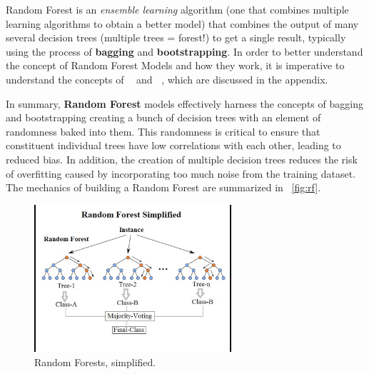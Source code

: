 Random Forest \cite{brownlee2018} \cite{carbonati_rf_scratch} \cite{enoz_rf_medium} is an \textit{ensemble learning} algorithm (one that combines multiple learning algorithms to obtain a better model) that combines the output of many several decision trees (multiple trees = forest!) to get a single result, typically using the process of \textbf{bagging} and \textbf{bootstrapping}.
In order to better understand the concept of Random Forest Models and how they work, it is imperative to understand the concepts of \textbf{~} and \textbf{~}, which are discussed in the appendix.

In summary, \textbf{Random Forest} models effectively harness the concepts of bagging and bootstrapping creating a bunch of decision trees with an element of randomness baked into them.
This randomness is critical to ensure that constituent individual trees have low correlations with each other, leading to reduced bias.
In addition, the creation of multiple decision trees reduces the risk of overfitting caused by incorporating too much noise from the training dataset.
The mechanics of building a Random Forest are summarized in ~\autoref{fig:rf}.

\begin{figure}[!htbp]
    \centering
    \includegraphics[width=0.65\textwidth]{img-3.png}
    \caption{Random Forests, simplified.}
    \label{fig:rf}
\end{figure}
\FloatBarrier


